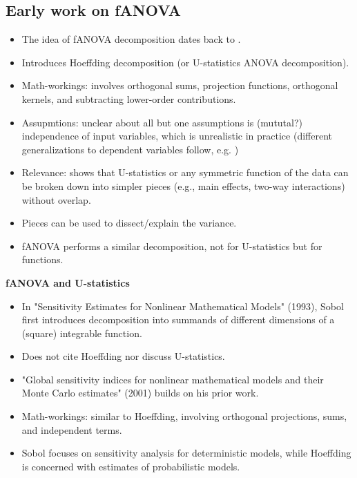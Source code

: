 \subsection*{Early work on fANOVA}
\begin{itemize}
    \item The idea of fANOVA decomposition dates back to \cite{hoeffding_class_1948}.
    \item Introduces Hoeffding decomposition (or U-statistics ANOVA decomposition).
    \item Math-workings: involves orthogonal sums, projection functions, orthogonal kernels, and subtracting lower-order contributions.
    \item Assupmtions: unclear about all but one assumptions is (mututal?) independence of input variables, which is unrealistic in practice (different generalizations to dependent variables follow, e.g. \cite{il_idrissi_hoeffding_2025})
    \item Relevance: shows that U-statistics or any symmetric function of the data can be broken down into simpler pieces (e.g., main effects, two-way interactions) without overlap.
    \item Pieces can be used to dissect/explain the variance.
    \item fANOVA performs a similar decomposition, not for U-statistics but for functions.
\end{itemize}
\textbf{fANOVA and U-statistics}


\begin{itemize}
    \item In "Sensitivity Estimates for Nonlinear Mathematical Models" (1993), Sobol first introduces decomposition into summands of different dimensions of a (square) integrable function.
    \item Does not cite Hoeffding nor discuss U-statistics.
    \item "Global sensitivity indices for nonlinear mathematical models and their Monte Carlo estimates" (2001) builds on his prior work.
    \item Math-workings: similar to Hoeffding, involving orthogonal projections, sums, and independent terms.
    \item Sobol focuses on sensitivity analysis for deterministic models, while Hoeffding is concerned with estimates of probabilistic models.
\end{itemize}

